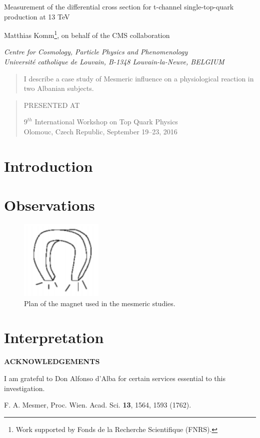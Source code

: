 \documentclass[12pt]{article}
\newcommand\pubnumber{SNSN-323-63}
\newcommand\pubdate{\today}
\def\institute{Centre for Cosmology, Particle Physics and Phenomenology\\
Universit\'e catholique de Louvain, B-1348 Louvain-la-Neuve, BELGIUM}
\def\support{\footnote{Work supported by Fonds de la Recherche Scientifique (FNRS).}}
\def\Title#1{\begin{center} {\Large #1 } \end{center}}
\def\Author#1{\begin{center}{ \sc #1} \end{center}}
\def\Address#1{\begin{center}{ \it #1} \end{center}}
\newcommand\pubblock{\rightline{\begin{tabular}{l} \pubnumber\\
         \pubdate  \end{tabular}}}
\newenvironment{Abstract}{\begin{quotation}  }{\end{quotation}}
\newenvironment{Presented}{\begin{quotation} \begin{center} 
             PRESENTED AT\end{center}\bigskip 
      \begin{center}\begin{large}}{\end{large}\end{center} \end{quotation}}
\def\Acknowledgements{\bigskip  \bigskip \begin{center} \begin{large}
             \bf ACKNOWLEDGEMENTS \end{large}\end{center}}
\begin{document}
\begin{titlepage}
\pubblock

\vfill
\Title{Measurement of the differential cross section for t-channel single-top-quark production at 13 TeV}
\vfill
\Author{ Matthias Komm\support, on behalf of the CMS collaboration}
\Address{\institute}
\vfill
\begin{Abstract}
I describe a case study of Mesmeric influence on a physiological  reaction
in two  Albanian subjects.
\end{Abstract}
\vfill
\begin{Presented}
$9^{th}$ International Workshop on Top Quark Physics\\
Olomouc, Czech Republic,  September 19--23, 2016
\end{Presented}
\vfill
\end{titlepage}
\def\thefootnote{\fnsymbol{footnote}}
\setcounter{footnote}{0}
%

\section{Introduction}


\section{Observations}


\begin{figure}[htb]
\centering
\includegraphics[height=1.5in]{magnet}
\caption{Plan of the magnet used in the mesmeric studies.}
\label{fig:magnet}
\end{figure}

\section{Interpretation}


\Acknowledgements
I am grateful to Don Alfonso d'Alba for certain services essential to 
this investigation.



\begin{thebibliography}{99}


F. A. Mesmer, Proc. Wien. Acad. Sci. {\bf 13}, 1564, 1593 (1762).


\end{thebibliography}

 
\end{document}
